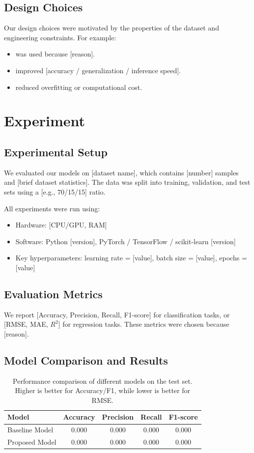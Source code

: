 \documentclass{article}
\begin{document}
\subsection{Design Choices}
Our design choices were motivated by the properties of the dataset and engineering constraints. For example:
\begin{itemize}
    \item [Choice 1] was used because [reason].
    \item [Choice 2] improved [accuracy / generalization / inference speed].
    \item [Choice 3] reduced overfitting or computational cost.
\end{itemize}

\section{Experiment}

\subsection{Experimental Setup}
We evaluated our models on [dataset name], which contains [number] samples and [brief dataset statistics]. The data was split into training, validation, and test sets using a [e.g., 70/15/15] ratio.

All experiments were run using:
\begin{itemize}
    \item Hardware: [CPU/GPU, RAM]
    \item Software: Python [version], PyTorch / TensorFlow / scikit-learn [version]
    \item Key hyperparameters: learning rate = [value], batch size = [value], epochs = [value]
\end{itemize}

\subsection{Evaluation Metrics}
We report [Accuracy, Precision, Recall, F1-score] for classification tasks, or [RMSE, MAE, $R^2$] for regression tasks. These metrics were chosen because [reason].

\subsection{Model Comparison and Results}

\begin{table}[H]
    \centering
    \caption{Performance comparison of different models on the test set. Higher is better for Accuracy/F1, while lower is better for RMSE.}
    \label{tab:results}
    \begin{tabular}{lcccc}
        \toprule
        Model & Accuracy & Precision & Recall & F1-score \\
        \midrule
        Baseline Model & 0.000 & 0.000 & 0.000 & 0.000 \\
        Proposed Model & 0.000 & 0.000 & 0.000 & 0.000 \\
        \bottomrule
    \end{tabular}
\end{table}
\end{document}

